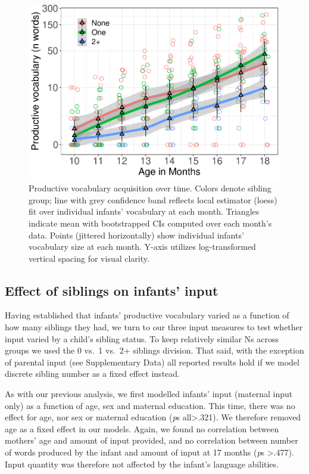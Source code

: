 \documentclass[
  english,
  man,floatsintext]{apa6}
\begin{document}
\begin{figure}
\centering
\includegraphics{SiblingsStudyText_files/figure-latex/Figure-SibGroup-1.pdf}
\caption{\label{fig:Figure-SibGroup}Productive vocabulary acquisition over time. Colors denote sibling group; line with grey confidence band reflects local estimator (loess) fit over individual infants' vocabulary at each month. Triangles indicate mean with bootstrapped CIs computed over each month's data. Points (jittered horizontally) show individual infants' vocabulary size at each month. Y-axis utilizes log-transformed vertical spacing for visual clarity.}
\end{figure}

\hypertarget{effect-of-siblings-on-infants-input}{%
\subsection{Effect of siblings on infants' input}\label{effect-of-siblings-on-infants-input}}

Having established that infants' productive vocabulary varied as a function of how many siblings they had, we turn to our three input measures to test whether input varied by a child's sibling status. To keep relatively similar Ns across groups we used the 0 vs.~1 vs.~2+ siblings division. That said, with the exception of parental input (see Supplementary Data) all reported results hold if we model discrete sibling number as a fixed effect instead.

As with our previous analysis, we first modelled infants' input (maternal input only) as a function of age, sex and maternal education. This time, there was no effect for age, nor sex or maternal education (\emph{p}s all\textgreater.321). We therefore removed age as a fixed effect in our models. Again, we found no correlation between mothers' age and amount of input provided, and no correlation between number of words produced by the infant and amount of input at 17 months (\emph{p}s \textgreater.477). Input quantity was therefore not affected by the infant's language abilities.
\end{document}
